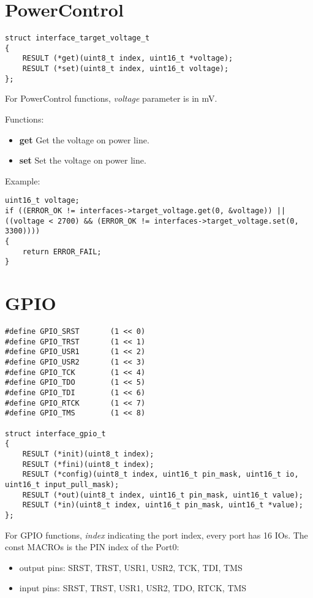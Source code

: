 \documentclass[a4paper,12pt]{book}
\begin{document}
\newpage
\section{PowerControl}
\begin{lstlisting}
struct interface_target_voltage_t
{
	RESULT (*get)(uint8_t index, uint16_t *voltage);
	RESULT (*set)(uint8_t index, uint16_t voltage);
};
\end{lstlisting}
For PowerControl functions, \emph{voltage} parameter is in mV.

\vspace{6pt}
Functions:
\begin{itemize}
\item \textbf{get}
Get the voltage on power line.
\item \textbf{set}
Set the voltage on power line.
\end{itemize}

\vspace{6pt}
Example:
\begin{lstlisting}
uint16_t voltage;
if ((ERROR_OK != interfaces->target_voltage.get(0, &voltage)) || ((voltage < 2700) && (ERROR_OK != interfaces->target_voltage.set(0, 3300))))
{
	return ERROR_FAIL;
}
\end{lstlisting}

\newpage
\section{GPIO}
\begin{lstlisting}
#define GPIO_SRST		(1 << 0)
#define GPIO_TRST		(1 << 1)
#define GPIO_USR1		(1 << 2)
#define GPIO_USR2		(1 << 3)
#define GPIO_TCK		(1 << 4)
#define GPIO_TDO		(1 << 5)
#define GPIO_TDI		(1 << 6)
#define GPIO_RTCK		(1 << 7)
#define GPIO_TMS		(1 << 8)

struct interface_gpio_t
{
	RESULT (*init)(uint8_t index);
	RESULT (*fini)(uint8_t index);
	RESULT (*config)(uint8_t index, uint16_t pin_mask, uint16_t io, uint16_t input_pull_mask);
	RESULT (*out)(uint8_t index, uint16_t pin_mask, uint16_t value);
	RESULT (*in)(uint8_t index, uint16_t pin_mask, uint16_t *value);
};
\end{lstlisting}
For GPIO functions, \emph{index} indicating the port index, every port has 16 IOs. The const MACROs is the PIN index of the Port0:
\begin{itemize}
\item output pins: SRST, TRST, USR1, USR2, TCK, TDI, TMS
\item input pins: SRST, TRST, USR1, USR2, TDO, RTCK, TMS
\end{itemize}
\end{document}
